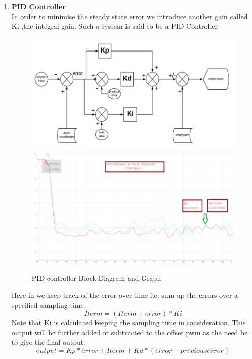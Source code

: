 \begin{enumerate}
    \item \textbf{PID Controller}\\
        In order to minimise the steady state error we introduce another gain called Ki ,the integral gain. Such a system is said to be a PID Controller
        \begin{figure}[H]
        \centering
        \includegraphics[width=0.8\linewidth]{SummerInterReport/project/Images-Major/pidblock.png}
        \includegraphics[width=0.8\linewidth]{SummerInterReport/project/Images-Major/pidgraph.png}
        \caption{PID controller Block Diagram and Graph}
        \label{fig:PIDcontroller}
    \end{figure}
    Here in we keep track of the error over time i.e. sum up the errors over a specified sampling time.
    \begin{equation}
        Iterm = (Iterm + error) * Ki
    \end{equation}
    Note that Ki is calculated keeping the sampling time in consideration. This output will be further added or subtracted to the oﬀset pwm as the need be to give the final output.
    \begin{equation}
        output = Kp*error + Iterm + Kd*(error - previous error)        
    \end{equation}


\end{enumerate}


















